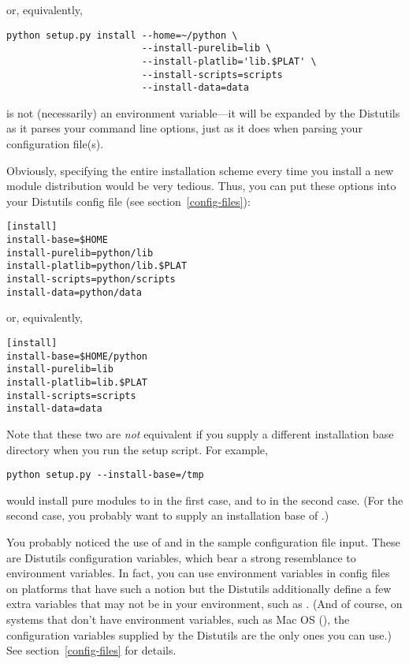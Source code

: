 \documentclass{howto}
\begin{document}
or, equivalently,

\begin{verbatim}
python setup.py install --home=~/python \
                        --install-purelib=lib \
                        --install-platlib='lib.$PLAT' \
                        --install-scripts=scripts
                        --install-data=data
\end{verbatim}

 is not (necessarily) an environment variable---it will be
expanded by the Distutils as it parses your command line options, just
as it does when parsing your configuration file(s).

Obviously, specifying the entire installation scheme every time you
install a new module distribution would be very tedious.  Thus, you can
put these options into your Distutils config file (see
section~\ref{config-files}):

\begin{verbatim}
[install]
install-base=$HOME
install-purelib=python/lib
install-platlib=python/lib.$PLAT
install-scripts=python/scripts
install-data=python/data
\end{verbatim}

or, equivalently,

\begin{verbatim}
[install]
install-base=$HOME/python
install-purelib=lib
install-platlib=lib.$PLAT
install-scripts=scripts
install-data=data
\end{verbatim}

Note that these two are \emph{not} equivalent if you supply a different
installation base directory when you run the setup script.  For example,

\begin{verbatim}
python setup.py --install-base=/tmp
\end{verbatim}

would install pure modules to  in the first
case, and to  in the second case.  (For the second
case, you probably want to supply an installation base of
\file{/tmp/python}.)

You probably noticed the use of \code{\$HOME} and  in the
sample configuration file input.  These are Distutils configuration
variables, which bear a strong resemblance to environment variables.
In fact, you can use environment variables in config files on
platforms that have such a notion but the Distutils additionally
define a few extra variables that may not be in your environment, such
as \code{\$PLAT}.  (And of course, on systems that don't have
environment variables, such as Mac OS (\XXX{true?}), the configuration
variables supplied by the Distutils are the only ones you can use.)
See section~\ref{config-files} for details.
\end{document}
